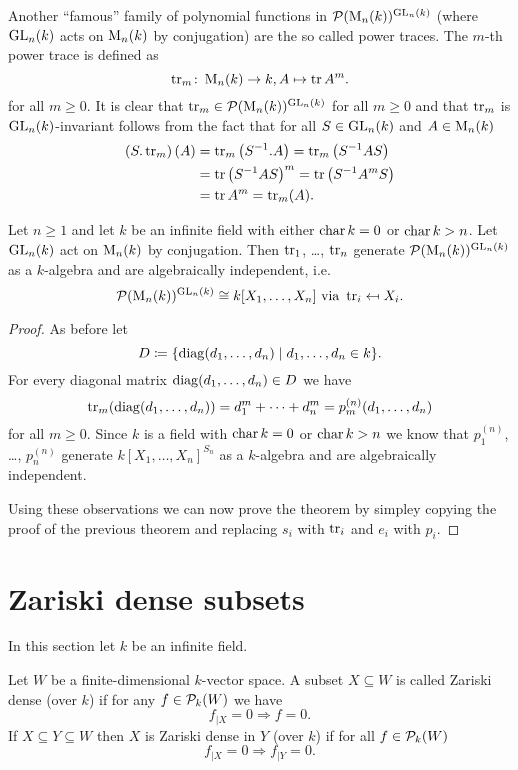 Another ``famous'' family of polynomial functions in $\mathcal{P}(\operatorname{M}_n(k))^{\operatorname{GL}_n(k)}$ (where $\operatorname{GL}_n(k)$ acts on $\operatorname{M}_n(k)$ by conjugation) are the so called power traces. The $m$-th power trace is defined as
\[
 \operatorname{tr}_m \colon \operatorname{M}_n(k) \to k, A \mapsto \operatorname{tr} A^m.
\]
for all $m \geq 0$. It is clear that $\operatorname{tr}_m \in \mathcal{P}(\operatorname{M}_n(k))^{\operatorname{GL}_n(k)}$ for all $m \geq 0$ and that $\operatorname{tr}_m$ is $\operatorname{GL}_n(k)$-invariant follows from the fact that for all $S \in \operatorname{GL}_n(k)$ and $A \in \operatorname{M}_n(k)$
\begin{align*}
 \left(S.\operatorname{tr}_m\right)(A)
 &= \operatorname{tr}_m\left(S^{-1}.A\right)
 = \operatorname{tr}_m\left(S^{-1} A S\right) \\
 &= \operatorname{tr} \left(S^{-1} A S\right)^m
 = \operatorname{tr} \left(S^{-1} A^m S\right) \\
 &= \operatorname{tr} A^m
 = \operatorname{tr}_m(A).
\end{align*}


\begin{thrm}
 Let $n \geq 1$ and let $k$ be an infinite field with either $\operatorname{char} k = 0$ or $\operatorname{char} k > n$. Let $\operatorname{GL}_n(k)$ act on $\operatorname{M}_n(k)$ by conjugation. Then $\operatorname{tr}_1$, \dots, $\operatorname{tr}_n$ generate $\mathcal{P}(\operatorname{M}_n(k))^{\operatorname{GL}_n(k)}$ as a $k$-algebra and are algebraically independent, i.e.
 \[
  \mathcal{P}(\operatorname{M}_n(k))^{\operatorname{GL}_n(k)} \cong k[X_1, \dotsc, X_n] \text{ via } \operatorname{tr}_i \mapsfrom X_i.
 \]
\end{thrm}
\begin{proof}
 As before let 
 \[
  D \coloneqq \{\operatorname{diag}(d_1, \dotsc, d_n) \mid d_1, \dotsc, d_n \in k\}.
 \]
 For every diagonal matrix $\operatorname{diag}(d_1, \dotsc, d_n) \in D$ we have
 \[
  \operatorname{tr}_m(\operatorname{diag}(d_1, \dotsc, d_n)) = d_1^m + \dotsb + d_n^m = p^{(n)}_m(d_1, \dotsc, d_n)
 \]
 for all $m \geq 0$. Since $k$ is a field with $\operatorname{char} k = 0$ or $\operatorname{char} k > n$ we know that $p^{(n)}_1$, \dots, $p^{(n)}_n$ generate $k[X_1, \dotsc, X_n]^{S_n}$ as a $k$-algebra and are algebraically independent.
 
 Using these observations we can now prove the theorem by simpley copying the proof of the previous theorem and replacing $s_i$ with $\operatorname{tr}_i$ and $e_i$ with $p_i$.
\end{proof}





\section{Zariski dense subsets}
In this section let $k$ be an infinite field.


\begin{defi}
 Let $W$ be a finite-dimensional $k$-vector space. A subset $X \subseteq W$ is called Zariski dense (over $k$) if for any $f \in \mathcal{P}_k(W)$ we have
 \[
  f_{|X} = 0 \Rightarrow f = 0.
 \]
 If $X \subseteq Y \subseteq W$ then $X$ is Zariski dense in $Y$ (over $k$) if for all $f \in \mathcal{P}_k(W)$
 \[
  f_{|X} = 0 \Rightarrow f_{|Y} = 0.
 \]
\end{defi}


